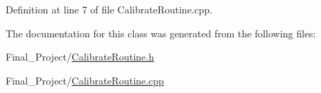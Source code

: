 Definition at line 7 of file Calibrate\-Routine.\-cpp.



The documentation for this class was generated from the following files\-:\begin{DoxyCompactItemize}
\item 
Final\-\_\-\-Project/\hyperlink{CalibrateRoutine_8h}{Calibrate\-Routine.\-h}\item 
Final\-\_\-\-Project/\hyperlink{CalibrateRoutine_8cpp}{Calibrate\-Routine.\-cpp}\end{DoxyCompactItemize}
